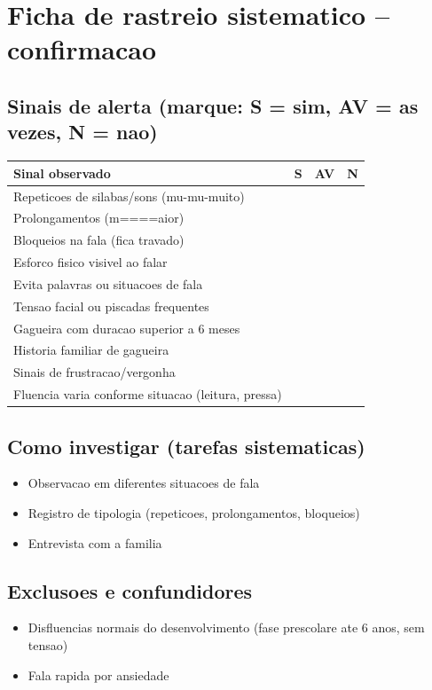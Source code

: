 \documentclass[a4paper,11pt]{book}
\begin{document}
\section*{Ficha de rastreio sistematico -- confirmacao}
\subsection*{Sinais de alerta (marque: S = sim, AV = as vezes, N = nao)}
\begin{tabular}{@{}p{11.5cm}ccc@{}}\toprule
Sinal observado & S & AV & N \\\midrule
Repeticoes de silabas/sons (mu-mu-muito) & & & \\
Prolongamentos (m====aior) & & & \\
Bloqueios na fala (fica travado) & & & \\
Esforco fisico visivel ao falar & & & \\
Evita palavras ou situacoes de fala & & & \\
Tensao facial ou piscadas frequentes & & & \\
Gagueira com duracao superior a 6 meses & & & \\
Historia familiar de gagueira & & & \\
Sinais de frustracao/vergonha & & & \\
Fluencia varia conforme situacao (leitura, pressa) & & & \\
\bottomrule\end{tabular}
\subsection*{Como investigar (tarefas sistematicas)}
\begin{itemize}
\item Observacao em diferentes situacoes de fala
\item Registro de tipologia (repeticoes, prolongamentos, bloqueios)
\item Entrevista com a familia
\end{itemize}
\subsection*{Exclusoes e confundidores}
\begin{itemize}
\item Disfluencias normais do desenvolvimento (fase prescolare ate 6 anos, sem tensao)
\item Fala rapida por ansiedade
\end{itemize}
\end{document}
